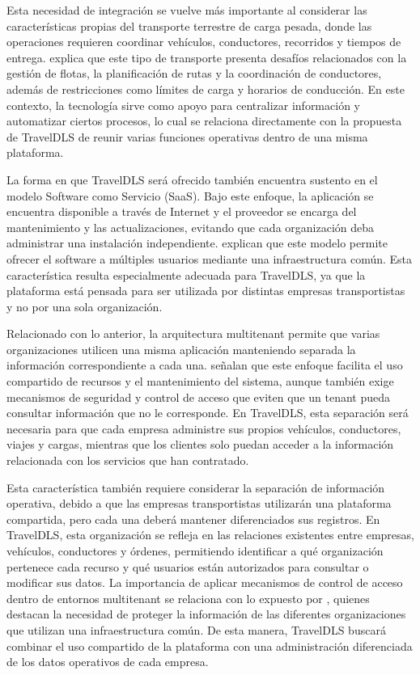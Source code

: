 Esta necesidad de integración se vuelve más importante al considerar las características propias del \hypertarget{concepto-carga-pesada}{}transporte terrestre de carga pesada, donde las operaciones requieren coordinar vehículos, conductores, recorridos y tiempos de entrega. \textcite[p.~67]{laura2024tecnologias} explica que este tipo de transporte presenta desafíos relacionados con la gestión de flotas, la planificación de rutas y la coordinación de conductores, además de restricciones como límites de carga y horarios de conducción. En este contexto, la tecnología sirve como apoyo para centralizar información y automatizar ciertos procesos, lo cual se relaciona directamente con la propuesta de TravelDLS de reunir varias funciones operativas dentro de una misma plataforma.

La forma en que TravelDLS será ofrecido también encuentra sustento en el modelo \hypertarget{concepto-saas}{}Software como Servicio (SaaS). Bajo este enfoque, la aplicación se encuentra disponible a través de Internet y el proveedor se encarga del mantenimiento y las actualizaciones, evitando que cada organización deba administrar una instalación independiente. \textcite[p.~33]{lasluisa2026diseno} explican que este modelo permite ofrecer el software a múltiples usuarios mediante una infraestructura común. Esta característica resulta especialmente adecuada para TravelDLS, ya que la plataforma está pensada para ser utilizada por distintas empresas transportistas y no por una sola organización.

Relacionado con lo anterior, la \hypertarget{concepto-multitenant}{}arquitectura multitenant permite que varias organizaciones utilicen una misma aplicación manteniendo separada la información correspondiente a cada una. \textcite[pp.~34--36]{lasluisa2026diseno} señalan que este enfoque facilita el uso compartido de recursos y el mantenimiento del sistema, aunque también exige mecanismos de seguridad y control de acceso que eviten que un tenant pueda consultar información que no le corresponde. En TravelDLS, esta separación será necesaria para que cada empresa administre sus propios vehículos, conductores, viajes y cargas, mientras que los clientes solo puedan acceder a la información relacionada con los servicios que han contratado.

Esta característica también requiere considerar la \hypertarget{concepto-separacion}{}separación de información operativa, debido a que las empresas transportistas utilizarán una plataforma compartida, pero cada una deberá mantener diferenciados sus registros. En TravelDLS, esta organización se refleja en las relaciones existentes entre empresas, vehículos, conductores y órdenes, permitiendo identificar a qué organización pertenece cada recurso y qué usuarios están autorizados para consultar o modificar sus datos. La importancia de aplicar mecanismos de control de acceso dentro de entornos multitenant se relaciona con lo expuesto por \textcite[pp.~34--36]{lasluisa2026diseno}, quienes destacan la necesidad de proteger la información de las diferentes organizaciones que utilizan una infraestructura común. De esta manera, TravelDLS buscará combinar el uso compartido de la plataforma con una administración diferenciada de los datos operativos de cada empresa.

